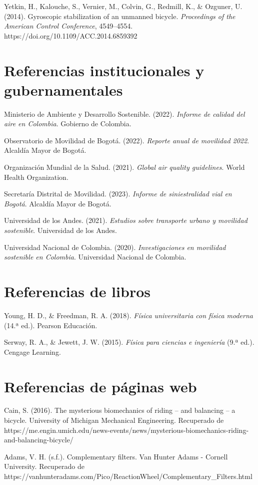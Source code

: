\documentclass[12pt,letterpaper]{report}
\begin{document}
Yetkin, H., Kalouche, S., Vernier, M., Colvin, G., Redmill, K., \& Ozguner, U. (2014). Gyroscopic stabilization of an unmanned bicycle. \textit{Proceedings of the American Control Conference}, 4549–4554. https://doi.org/10.1109/ACC.2014.6859392

\section*{Referencias institucionales y gubernamentales}

Ministerio de Ambiente y Desarrollo Sostenible. (2022). \textit{Informe de calidad del aire en Colombia}. Gobierno de Colombia.

Observatorio de Movilidad de Bogotá. (2022). \textit{Reporte anual de movilidad 2022}. Alcaldía Mayor de Bogotá.

Organización Mundial de la Salud. (2021). \textit{Global air quality guidelines}. World Health Organization.

Secretaría Distrital de Movilidad. (2023). \textit{Informe de siniestralidad vial en Bogotá}. Alcaldía Mayor de Bogotá.

Universidad de los Andes. (2021). \textit{Estudios sobre transporte urbano y movilidad sostenible}. Universidad de los Andes.

Universidad Nacional de Colombia. (2020). \textit{Investigaciones en movilidad sostenible en Colombia}. Universidad Nacional de Colombia.

\section*{Referencias de libros}

Young, H. D., \& Freedman, R. A. (2018). \textit{Física universitaria con física moderna} (14.ª ed.). Pearson Educación.

Serway, R. A., \& Jewett, J. W. (2015). \textit{Física para ciencias e ingeniería} (9.ª ed.). Cengage Learning.

\section*{Referencias de páginas web}

Cain, S. (2016). The mysterious biomechanics of riding – and balancing – a bicycle. University of Michigan Mechanical Engineering. Recuperado de https://me.engin.umich.edu/news-events/news/mysterious-biomechanics-riding-and-balancing-bicycle/

Adams, V. H. (s.f.). Complementary filters. Van Hunter Adams - Cornell University. Recuperado de https://vanhunteradams.com/Pico/ReactionWheel/Complementary\_Filters.html
\end{document}
